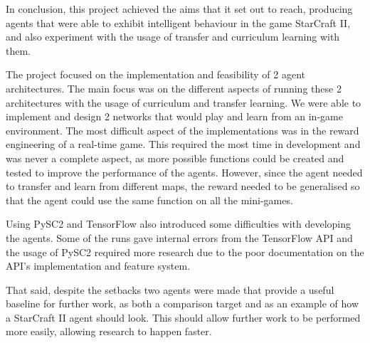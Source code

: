 In conclusion, this project achieved the aims that it set out to reach,
producing agents that were able to exhibit intelligent behaviour in the game
StarCraft II, and also experiment with the usage of transfer and curriculum
learning with them.

The project focused on the implementation and feasibility of 2 agent
architectures. The main focus was on the different aspects of running these 2
architectures with the usage of curriculum and transfer learning. We were able
to implement and design 2 networks that would play and learn from an in-game
environment. The most difficult aspect of the implementations was in the reward
engineering of a real-time game. This required the most time in development and
was never a complete aspect, as more possible functions could be created and
tested to improve the performance of the agents. However, since the agent needed
to transfer and learn from different maps, the reward needed to be generalised
so that the agent could use the same function on all the mini-games.

Using PySC2 and TensorFlow also introduced some difficulties with developing the
agents. Some of the runs gave internal errors from the TensorFlow API and the
usage of PySC2 required more research due to the poor documentation on the API's
implementation and feature system.

That said, despite the setbacks two agents were made that provide a useful
baseline for further work, as both a comparison target and as an example of how
a StarCraft II agent should look. This should allow further work to be performed
more easily, allowing research to happen faster.
